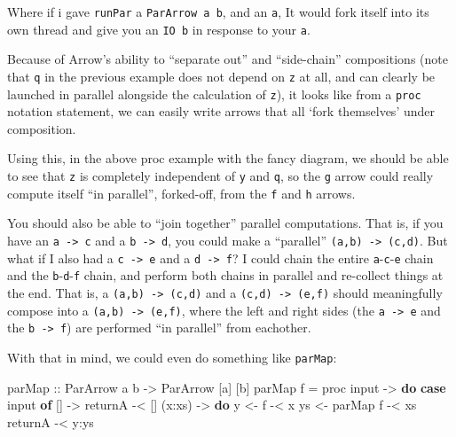 \documentclass[]{article}
\newenvironment{Shaded}{}{}
\newcommand{\DataTypeTok}[1]{\textcolor[rgb]{0.56,0.13,0.00}{#1}}
\newcommand{\FunctionTok}[1]{\textcolor[rgb]{0.02,0.16,0.49}{#1}}
\newcommand{\KeywordTok}[1]{\textcolor[rgb]{0.00,0.44,0.13}{\textbf{#1}}}
\newcommand{\NormalTok}[1]{#1}
\newcommand{\OtherTok}[1]{\textcolor[rgb]{0.00,0.44,0.13}{#1}}
\begin{document}
Where if i gave \texttt{runPar} a \texttt{ParArrow\ a\ b}, and an \texttt{a}, It
would fork itself into its own thread and give you an \texttt{IO\ b} in response
to your \texttt{a}.

Because of Arrow's ability to ``separate out'' and ``side-chain'' compositions
(note that \texttt{q} in the previous example does not depend on \texttt{z} at
all, and can clearly be launched in parallel alongside the calculation of
\texttt{z}), it looks like from a \texttt{proc} notation statement, we can
easily write arrows that all `fork themselves' under composition.

Using this, in the above proc example with the fancy diagram, we should be able
to see that \texttt{z} is completely independent of \texttt{y} and \texttt{q},
so the \texttt{g} arrow could really compute itself ``in parallel'', forked-off,
from the \texttt{f} and \texttt{h} arrows.

You should also be able to ``join together'' parallel computations. That is, if
you have an \texttt{a\ -\textgreater{}\ c} and a \texttt{b\ -\textgreater{}\ d},
you could make a ``parallel'' \texttt{(a,b)\ -\textgreater{}\ (c,d)}. But what
if I also had a \texttt{c\ -\textgreater{}\ e} and a
\texttt{d\ -\textgreater{}\ f}? I could chain the entire
\texttt{a}-\texttt{c}-\texttt{e} chain and the \texttt{b}-\texttt{d}-\texttt{f}
chain, and perform both chains in parallel and re-collect things at the end.
That is, a \texttt{(a,b)\ -\textgreater{}\ (c,d)} and a
\texttt{(c,d)\ -\textgreater{}\ (e,f)} should meaningfully compose into a
\texttt{(a,b)\ -\textgreater{}\ (e,f)}, where the left and right sides (the
\texttt{a\ -\textgreater{}\ e} and the \texttt{b\ -\textgreater{}\ f}) are
performed ``in parallel'' from eachother.

With that in mind, we could even do something like \texttt{parMap}:

\begin{Shaded}
\begin{Highlighting}[]
\OtherTok{parMap ::} \DataTypeTok{ParArrow}\NormalTok{ a b }\OtherTok{->} \DataTypeTok{ParArrow}\NormalTok{ [a] [b]}
\NormalTok{parMap f }\FunctionTok{=}\NormalTok{ proc input }\OtherTok{->} \KeywordTok{do}
    \KeywordTok{case}\NormalTok{ input }\KeywordTok{of}
\NormalTok{      []     }\OtherTok{->}
\NormalTok{          returnA        }\FunctionTok{-<}\NormalTok{ []}
\NormalTok{      (x}\FunctionTok{:}\NormalTok{xs) }\OtherTok{->} \KeywordTok{do}
\NormalTok{          y  }\OtherTok{<-}\NormalTok{ f        }\FunctionTok{-<}\NormalTok{ x}
\NormalTok{          ys }\OtherTok{<-}\NormalTok{ parMap f }\FunctionTok{-<}\NormalTok{ xs}
\NormalTok{          returnA        }\FunctionTok{-<}\NormalTok{ y}\FunctionTok{:}\NormalTok{ys}
\end{Highlighting}
\end{Shaded}
\end{document}
